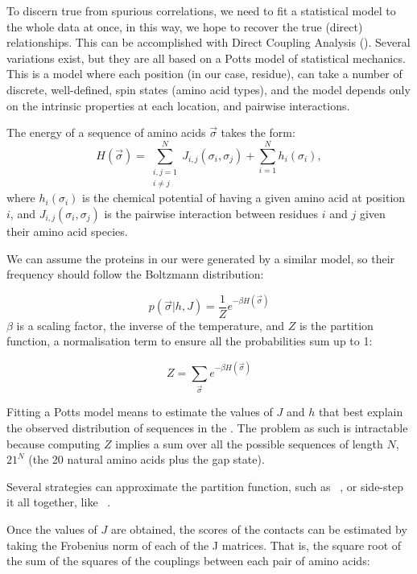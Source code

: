 To discern true from spurious correlations, we need to fit a statistical model to the whole data at once, in this way, we hope to recover the true (direct) relationships.
This can be accomplished with Direct Coupling Analysis (\DCA).
Several variations exist, but they are all based on a Potts model of statistical mechanics.
This is a model where each position (in our case, residue), can take a number of discrete, well-defined, spin states (amino acid types), and the model depends only on the intrinsic properties at each location, and pairwise interactions.

The energy of a sequence of amino acids $\vec{\sigma}$ takes the form:
\begin{equation*}
H(\vec \sigma) = \sum_{\substack{i,j=1\\i \neq j}}^N J_{i, j}(\sigma_i, \sigma_j) + \sum_{i=1}^N h_i(\sigma_i),
\end{equation*}
where $h_i(\sigma_i)$ is the chemical potential of having a given amino acid at position $i$, and $ J_{i, j}(\sigma_i, \sigma_j)$ is the pairwise interaction between residues $i$ and $j$ given their amino acid species.

We can assume the proteins in our \MSA{} were generated by a similar model, so their frequency should follow the Boltzmann distribution:

\begin{equation*}
p(\vec{\sigma} |  h, J) = \frac{1}{Z} e^{-\beta H\left(\vec{\sigma}\right)}
\end{equation*}
$\beta$ is a scaling factor, the inverse of the temperature, and $Z$ is the partition function, a normalisation term to ensure all the probabilities sum up to 1:

\begin{equation*}
Z = \sum_{\vec{\sigma}} e^{-\beta H\left(\vec{\sigma}\right)}
\end{equation*}

Fitting a Potts model means to estimate the values of $J$ and $h$ that best explain the observed distribution of sequences in the \MSA.
The problem as such is intractable because computing $Z$ implies a sum over all the possible sequences of length $N$, $21^N$ (the 20 natural amino acids plus the gap state).

Several strategies can approximate the partition function, such as \plmDCA~\citep{plmDCA}, or side-step it all together, like \GaussDCA~\citep{GaussDCA}.

Once the values of $J$ are obtained, the scores of the contacts can be estimated by taking the Frobenius norm of each of the J matrices.
That is, the square root of the sum of the squares of the couplings between each pair of amino acids:


